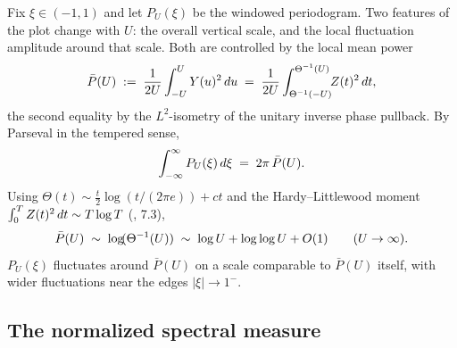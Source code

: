 \documentclass{article}
\newcommand{\assign}{:=}
\begin{document}
Fix $\xi \in (- 1, 1)$ and let $P_U (\xi)$ be the windowed periodogram. Two
features of the plot change with $U$: the overall vertical scale, and the
local fluctuation amplitude around that scale. Both are controlled by the
local mean power
\[ \bar{P} (U) \hspace{0.27em} \assign \hspace{0.27em} \frac{1}{2 U}  \int_{-
   U}^U Y (u)^2  \hspace{0.17em} du \hspace{0.27em} = \hspace{0.27em}
   \frac{1}{2 U}  \int_{\Theta^{- 1}  (- U)}^{\Theta^{- 1} (U)}
   \hspace{-0.17em} \hspace{-0.17em} Z (t)^2  \hspace{0.17em} dt, \]
the second equality by the $L^2$-isometry of the unitary inverse phase
pullback. By Parseval in the tempered sense,
\[ \int_{- \infty}^{\infty} P_U (\xi)  \hspace{0.17em} d \xi \hspace{0.27em} =
   \hspace{0.27em} 2 \pi \hspace{0.17em} \bar{P} (U) . \]
Using $\Theta (t) \sim \tfrac{t}{2} \log (t / (2 \pi e)) + ct$ and the
Hardy--Littlewood moment $\int_0^T Z (t)^2  \hspace{0.17em} dt \sim T \log T$
({\cite{Titchmarsh}}, {\textsection}7.3),
\[ \bar{P} (U) \hspace{0.27em} \sim \hspace{0.27em} \log \hspace{-0.17em}
   (\Theta^{- 1} (U)) \hspace{0.27em} \sim \hspace{0.27em} \log U + \log \log
   U + O (1)  \qquad (U \to \infty) . \]
$P_U (\xi)$ fluctuates around $\bar{P} (U)$ on a scale comparable to $\bar{P}
(U)$ itself, with wider fluctuations near the edges $| \xi | \to 1^-$.

\subsection{The normalized spectral measure}\label{app:normalized}
\end{document}
